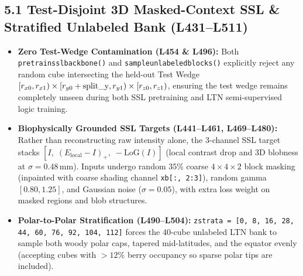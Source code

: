 \documentclass[10pt,a4paper]{article}
\renewcommand{\_}{\origunderscore\allowbreak}
\begin{document}
\subsection*{5.1 Test-Disjoint 3D Masked-Context SSL \& Stratified Unlabeled Bank (L431--L511)}
\begin{annotbox}
\begin{itemize}
    \item \textbf{Zero Test-Wedge Contamination (L454 \& L496):} Both \texttt{pretrain\_ssl\_backbone()} and \texttt{sample\_unlabeled\_blocks()} explicitly reject any random cube intersecting the held-out Test Wedge $[r_{x0}, r_{x1}) \times [r_{y0} + \text{split\_y}, r_{y1}) \times [r_{z0}, r_{z1})$, ensuring the test wedge remains completely unseen during both SSL pretraining and LTN semi-supervised logic training.
    \item \textbf{Biophysically Grounded SSL Targets (L441--L461, L469--L480):} Rather than reconstructing raw intensity alone, the 3-channel SSL target stacks $[I,\; (E_{\text{local}} - I)_+,\; -\text{LoG}(I)]$ (local contrast drop and 3D blobness at $\sigma = 0.48\,\text{mm}$). Inputs undergo random $35\%$ coarse $4{\times}4{\times}2$ block masking (inpainted with coarse shading channel \texttt{xb[:, 2:3]}), random gamma $[0.80, 1.25]$, and Gaussian noise ($\sigma = 0.05$), with extra loss weight on masked regions and blob structures.
    \item \textbf{Polar-to-Polar Stratification (L490--L504):} \texttt{z\_strata = [0, 8, 16, 28, 44, 60, 76, 92, 104, 112]} forces the 40-cube unlabeled LTN bank to sample both woody polar caps, tapered mid-latitudes, and the equator evenly (accepting cubes with $>12\%$ berry occupancy so sparse polar tips are included).
\end{itemize}
\end{annotbox}
\end{document}
